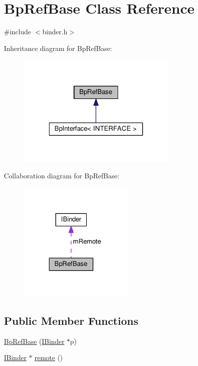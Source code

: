 \hypertarget{classBpRefBase}{\section{Bp\-Ref\-Base Class Reference}
\label{classBpRefBase}
}


{\ttfamily \#include $<$binder.\-h$>$}



Inheritance diagram for Bp\-Ref\-Base\-:
\nopagebreak
\begin{figure}[H]
\begin{center}
\leavevmode
\includegraphics[width=222pt]{classBpRefBase__inherit__graph}
\end{center}
\end{figure}


Collaboration diagram for Bp\-Ref\-Base\-:
\nopagebreak
\begin{figure}[H]
\begin{center}
\leavevmode
\includegraphics[width=159pt]{classBpRefBase__coll__graph}
\end{center}
\end{figure}
\subsection*{Public Member Functions}
\begin{DoxyCompactItemize}
\item 
\hyperlink{classBpRefBase_aef592ef9a6af0dfe2101da969c5f5ab0}{Bp\-Ref\-Base} (\hyperlink{classIBinder}{I\-Binder} $\ast$p)
\item 
\hyperlink{classIBinder}{I\-Binder} $\ast$ \hyperlink{classBpRefBase_ac52fd0b3fb7dbf09140993c73a6c3a3e}{remote} ()
\end{DoxyCompactItemize}
